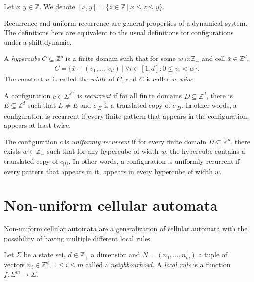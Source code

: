 \documentclass[runningheads]{llncs}
\newcommand{\Z}{\mathbb{Z}}
\newcommand{\set}[2]{\{ #1 \: | \: #2 \}}
\newcommand{\confspace}{\Sigma^{\Z^d}}
\begin{document}
\begin{notation}
Let $x,y\in \Z$. We denote $[x,y] = \set{z \in \Z}{x \leq z \leq y}$.
\end{notation} 

Recurrence and uniform recurrence are general properties of a dynamical system. The definitions here are equivalent to the usual definitions for configurations under a shift dynamic.

\begin{definition}
A \emph{hypercube} $C \subseteq \Z^d$ is a finite domain such that for some  $w\ in \Z_+$ and cell $\bar{x} \in \Z^d$, 
\begin{align*}
C = \set{\bar x + (v_1,\ldots,v_d)}{\forall i\in [1,d]: 0 \leq v_i < w}.
\end{align*}
The constant $w$ is called the \emph{width} of $C$, and $C$ is called \emph{$w$-wide}.
\end{definition}

\begin{definition}
A configuration $c \in \confspace$ is \emph{recurrent} if for all finite domains $D \subseteq \Z^d$, there is  $E \subseteq \Z^d$ such that $D\neq E$ and $c_{|E}$ is a translated copy of $c_{|D}$.
In other words, a configuration is recurrent if every finite pattern that appears in the configuration, appears at least twice. 

The configuration $c$ is \emph{uniformly recurrent} if for every finite domain $D \subseteq \Z^d$, there exists $w \in \Z_+$ such that for any hypercube of width $w$, the hypercube contains a translated copy of $c_{|D}$. In other words, a configuration is uniformly recurrent if every pattern that appears in it, appears in every hypercube of width $w$.
\end{definition}

\section{Non-uniform cellular automata}

Non-uniform cellular automata are a generalization of cellular automata with the possibility of having multiple different local rules. 

\begin{definition}
Let $\Sigma$ be a state set, $d \in \Z_+$ a dimension and $N = (\bar n_1,\ldots,\bar n_m)$ a tuple of vectors $\bar n_i \in \Z^d$, $1\leq i \leq m$ called a \emph{neighbourhood}. A \emph{local rule} is a function $f:\Sigma^m \rightarrow \Sigma$.
\end{definition}
\end{document}
